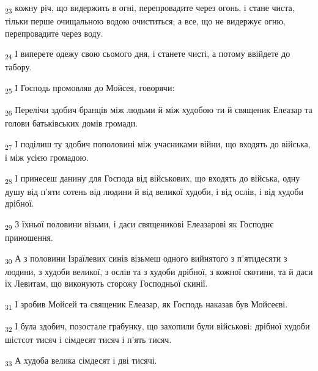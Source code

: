 \begin{tcolorbox}
\textsubscript{23} кожну річ, що видержить в огні, перепровадите через огонь, і стане чиста, тільки перше очищальною водою очиститься; а все, що не видержує огню, перепровадите через воду.
\end{tcolorbox}
\begin{tcolorbox}
\textsubscript{24} І виперете одежу свою сьомого дня, і станете чисті, а потому ввійдете до табору.
\end{tcolorbox}
\begin{tcolorbox}
\textsubscript{25} І Господь промовляв до Мойсея, говорячи:
\end{tcolorbox}
\begin{tcolorbox}
\textsubscript{26} Перелічи здобич бранців між людьми й між худобою ти й священик Елеазар та голови батьківських домів громади.
\end{tcolorbox}
\begin{tcolorbox}
\textsubscript{27} І поділиш ту здобич пополовині між учасниками війни, що входять до війська, і між усією громадою.
\end{tcolorbox}
\begin{tcolorbox}
\textsubscript{28} І принесеш данину для Господа від військових, що входять до війська, одну душу від п'яти сотень від людини й від великої худоби, і від ослів, і від худоби дрібної.
\end{tcolorbox}
\begin{tcolorbox}
\textsubscript{29} З їхньої половини візьми, і даси священикові Елеазарові як Господнє приношення.
\end{tcolorbox}
\begin{tcolorbox}
\textsubscript{30} А з половини Ізраїлевих синів візьмеш одного вийнятого з п'ятидесяти з людини, з худоби великої, з ослів та з худоби дрібної, з кожної скотини, та й даси їх Левитам, що виконують сторожу Господньої скинії.
\end{tcolorbox}
\begin{tcolorbox}
\textsubscript{31} І зробив Мойсей та священик Елеазар, як Господь наказав був Мойсеєві.
\end{tcolorbox}
\begin{tcolorbox}
\textsubscript{32} І була здобич, позостале грабунку, що захопили були військові: дрібної худоби шістсот тисяч і сімдесят тисяч і п'ять тисяч.
\end{tcolorbox}
\begin{tcolorbox}
\textsubscript{33} А худоба велика сімдесят і дві тисячі.
\end{tcolorbox}
